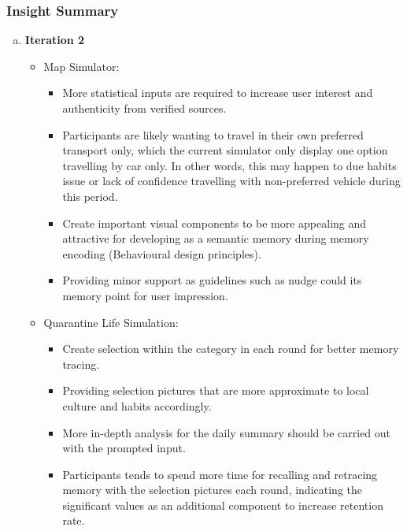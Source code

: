     \subsubsection{Insight Summary}
      \begin{enumerate}[a)]
        \item \textbf{Iteration 2}
        \begin{itemize}
          \item Map Simulator:
            \begin{itemize}
              \item More statistical inputs are required to increase user interest and authenticity from verified sources. 
              \item Participants are likely wanting to travel in their own preferred transport only, which the current simulator only display one option travelling by car only. In other words, this may happen to due habits issue or lack of confidence travelling with non-preferred vehicle during this period.
              \item Create important visual components to be more appealing and attractive for developing as a semantic memory during memory encoding (Behavioural design principles).
              \item Providing minor support as guidelines such as nudge could its memory point for user impression.
            \end{itemize}
          \item Quarantine Life Simulation:
            \begin{itemize}
              \item Create selection within the category in each round for better memory tracing.
              \item Providing selection pictures that are more approximate to local culture and habits accordingly.
              \item More in-depth analysis for the daily summary should be carried out with the prompted input.
              \item Participants tends to spend more time for recalling and retracing memory with the selection pictures each round, indicating the significant values as an additional component to increase retention rate.
            \end{itemize}
        \end{itemize}
      \end{enumerate}
